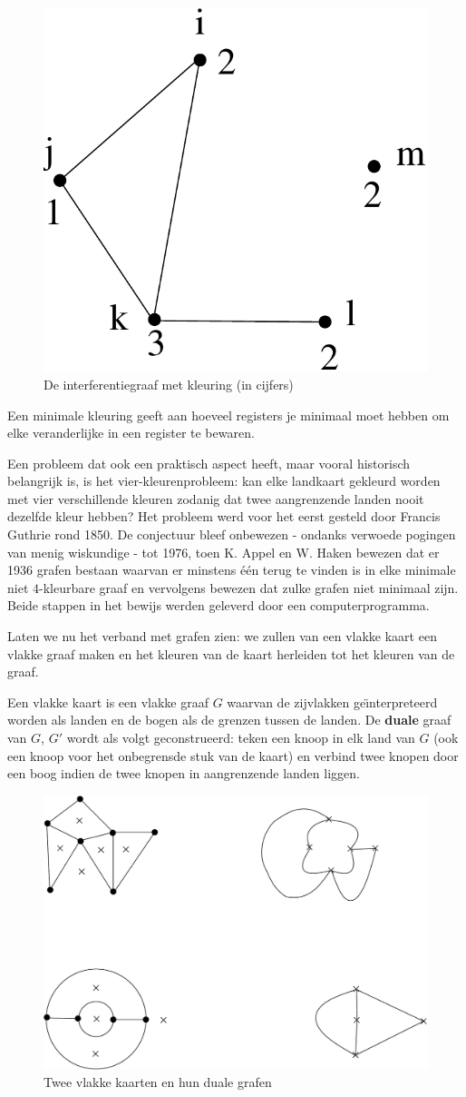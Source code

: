 \begin{itemize}
\begin{figure}[ht]
\begin{center}
\includegraphics[width=0.2\linewidth,keepaspectratio]{regalloc1}
\end{center}
\caption{De interferentiegraaf met kleuring (in cijfers) \label{regalloc1}}
\end{figure}

Een minimale kleuring geeft aan hoeveel registers je minimaal moet
hebben om elke veranderlijke in een register te bewaren.

\end{itemize}


Een probleem dat ook een praktisch aspect heeft, maar vooral
historisch belangrijk is, is het vier-kleurenprobleem: kan elke
landkaart gekleurd worden met vier verschillende kleuren zodanig dat twee
aangrenzende landen nooit dezelfde kleur hebben? Het probleem werd
voor het eerst gesteld door Francis Guthrie rond 1850. De conjectuur
bleef onbewezen - ondanks verwoede pogingen van menig wiskundige - tot
1976, toen K. Appel en W. Haken bewezen dat er
1936 grafen bestaan
waarvan er minstens \'{e}\'{e}n terug te vinden is in elke minimale
niet $4$-kleurbare graaf en vervolgens bewezen dat zulke grafen niet
minimaal zijn. Beide stappen in het bewijs werden geleverd door een
computerprogramma.

Laten we nu het verband met grafen zien: we zullen van een vlakke
kaart een vlakke graaf maken en het kleuren van de kaart herleiden tot
het kleuren van de graaf.

Een vlakke kaart is een vlakke graaf $G$ waarvan de zijvlakken
ge\"{\i}nterpreteerd worden als landen en de bogen als de grenzen tussen de
landen. De \textbf{duale} graaf van $G$, $G'$ wordt als volgt
geconstrueerd: teken een knoop in elk land van $G$ (ook een knoop voor
het onbegrensde stuk van de kaart) en verbind twee knopen door een
boog indien de twee knopen in aangrenzende landen liggen.

\begin{figure}[ht]
\begin{center}
\includegraphics[width=0.6\linewidth,keepaspectratio]{dual1}
\end{center}
\caption{Twee vlakke kaarten en hun duale grafen\label{dual1}}
\end{figure}

